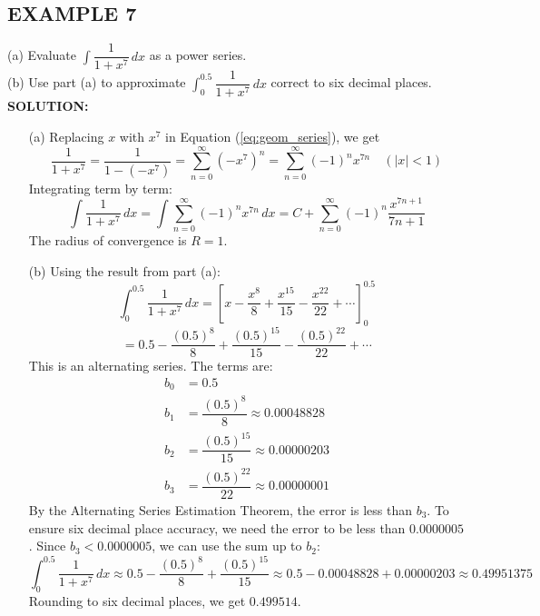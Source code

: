 \documentclass{article}
\theoremstyle{mystyle}
\begin{document}
\subsection*{EXAMPLE 7}
(a) Evaluate \( \int \dfrac{1}{1+x^7} \,dx \) as a power series. \\
(b) Use part (a) to approximate \( \int_0^{0.5} \dfrac{1}{1+x^7} \,dx \) correct to six decimal places.\\
\textbf{SOLUTION:}
\begin{itemize}
    \item[(a)] Replacing \(x\) with \(x^7\) in Equation (\ref{eq:geom_series}), we get
    \[ \dfrac{1}{1+x^7} = \dfrac{1}{1-(-x^7)} = \sum_{n=0}^{\infty} (-x^7)^n = \sum_{n=0}^{\infty} (-1)^n x^{7n} \quad (|x|<1) \]
    Integrating term by term:
    \[ \int \dfrac{1}{1+x^7} \,dx = \int \sum_{n=0}^{\infty} (-1)^n x^{7n} \,dx = C + \sum_{n=0}^{\infty} (-1)^n \dfrac{x^{7n+1}}{7n+1} \]
    The radius of convergence is \(R=1\).
    \item[(b)] Using the result from part (a):
    \[ \int_0^{0.5} \dfrac{1}{1+x^7} \,dx = \left[ x - \dfrac{x^8}{8} + \dfrac{x^{15}}{15} - \dfrac{x^{22}}{22} + \cdots \right]_0^{0.5} \]
    \[ = 0.5 - \dfrac{(0.5)^8}{8} + \dfrac{(0.5)^{15}}{15} - \dfrac{(0.5)^{22}}{22} + \cdots \]
    This is an alternating series. The terms are:
    \begin{align*}
        b_0 &= 0.5 \\
        b_1 &= \dfrac{(0.5)^8}{8} \approx 0.00048828 \\
        b_2 &= \dfrac{(0.5)^{15}}{15} \approx 0.00000203 \\
        b_3 &= \dfrac{(0.5)^{22}}{22} \approx 0.00000001
    \end{align*}
    By the Alternating Series Estimation Theorem, the error is less than \(b_3\). To ensure six decimal place accuracy, we need the error to be less than \(0.0000005\). Since \(b_3 < 0.0000005\), we can use the sum up to \(b_2\):
    \[ \int_0^{0.5} \dfrac{1}{1+x^7} \,dx \approx 0.5 - \dfrac{(0.5)^8}{8} + \dfrac{(0.5)^{15}}{15} \approx 0.5 - 0.00048828 + 0.00000203 \approx 0.49951375 \]
    Rounding to six decimal places, we get \(0.499514\).
\end{itemize}
\end{document}
